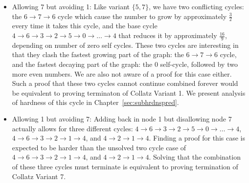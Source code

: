 \begin{itemize}
\begin{itemize}
        \item Allowing 7 but avoiding 1: Like variant $\{5,7\}$, we have two conflicting cycles: the $6 \rightarrow 7 \rightarrow 6$ cycle which cause the number to grow by approximately $\frac{3}{2}$ every time it takes this cycle, and the base cycle $4 \rightarrow 6 \rightarrow 3 \rightarrow 2 \rightarrow 5 \rightarrow 0 \rightarrow \ldots \rightarrow 4$ that reduces it by approximately $\frac{16}{9}$, depending on number of zero self cycles. These two cycles are interesting in that they clash the fastest growing part of the graph: the $6 \rightarrow 7 \rightarrow 6$ cycle, and the fastest decaying part of the graph: the 0 self-cycle, followed by two more even numbers. We are also not aware of a proof for this case either. Such a proof that these two cycles cannot continue combined forever would be equivalent to proving terminaton of Collatz Variant 1. We present analysis of hardness of this cycle in Chapter~\ref{sec:subhrdnspred}.
        \item Allowing 1 but avoiding 7: Adding back in node 1 but disallowing node 7 actually allows for three different cycles: $4 \rightarrow 6 \rightarrow 3 \rightarrow 2 \rightarrow 5 \rightarrow 0 \rightarrow \ldots \rightarrow 4$, $4 \rightarrow 6 \rightarrow 3 \rightarrow 2 \rightarrow 1 \rightarrow 4$, and $4 \rightarrow 2 \rightarrow 1 \rightarrow 4$.  Finding a proof for this case is expected to be harder than the unsolved two cycle case of $4 \rightarrow 6 \rightarrow 3 \rightarrow 2 \rightarrow 1 \rightarrow 4$, and $4 \rightarrow 2 \rightarrow 1 \rightarrow 4$. Solving that the combination of these three cycles must terminate is equivalent to proving termination of Collatz Variant 7.
    \end{itemize}
\end{itemize}
